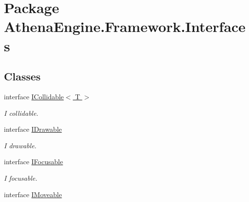\hypertarget{namespace_athena_engine_1_1_framework_1_1_interfaces}{\section{Package Athena\-Engine.\-Framework.\-Interfaces}
\label{namespace_athena_engine_1_1_framework_1_1_interfaces}
}
\subsection*{Classes}
\begin{DoxyCompactItemize}
\item 
interface \hyperlink{interface_athena_engine_1_1_framework_1_1_interfaces_1_1_i_collidable_3_01_t_01_4}{I\-Collidable$<$ T $>$}
\begin{DoxyCompactList}\small\item\em I collidable. \end{DoxyCompactList}\item 
interface \hyperlink{interface_athena_engine_1_1_framework_1_1_interfaces_1_1_i_drawable}{I\-Drawable}
\begin{DoxyCompactList}\small\item\em I drawable. \end{DoxyCompactList}\item 
interface \hyperlink{interface_athena_engine_1_1_framework_1_1_interfaces_1_1_i_focusable}{I\-Focusable}
\begin{DoxyCompactList}\small\item\em I focusable. \end{DoxyCompactList}\item 
interface \hyperlink{interface_athena_engine_1_1_framework_1_1_interfaces_1_1_i_moveable}{I\-Moveable}
\end{DoxyCompactItemize}
